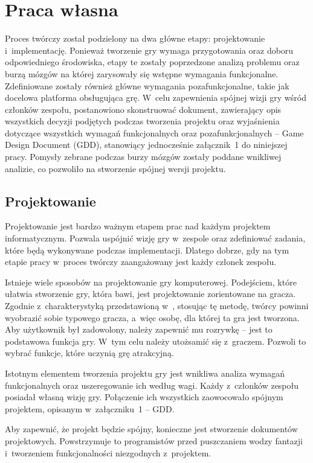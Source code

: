 \chapter{Praca własna}
Proces twórczy został podzielony na dwa główne etapy: projektowanie i~implementację. Ponieważ tworzenie gry wymaga przygotowania oraz doboru odpowiedniego środowiska, etapy te zostały poprzedzone analizą problemu oraz burzą mózgów na której zarysowały się wstępne wymagania funkcjonalne. Zdefiniowane zostały również główne wymagania pozafunkcjonalne, takie jak docelowa platforma obsługująca grę. W~celu zapewnienia spójnej wizji gry wśród członków zespołu, postanowiono skonstruować dokument, zawierający opis wszystkich decyzji podjętych podczas tworzenia projektu oraz wyjaśnienia dotyczące wszystkich wymagań funkcjonalnych oraz pozafunkcjonalnych -- Game Design Document (GDD), stanowiący jednocześnie załącznik~1 do niniejszej pracy.  Pomysły zebrane podczas burzy mózgów zostały poddane wnikliwej analizie, co pozwoliło na stworzenie spójnej wersji projektu. 

\section{Projektowanie}
Projektowanie jest bardzo ważnym etapem prac nad każdym projektem informatycznym. Pozwala uspójnić wizję gry w~zespole oraz zdefiniować zadania, które będą wykonywane podczas implementacji. Dlatego dobrze, gdy na tym etapie pracy w~proces twórczy zaangażowany jest każdy członek zespołu. 

Istnieje wiele sposobów na projektowanie gry komputerowej. Podejściem, które ułatwia stworzenie gry, która bawi, jest projektowanie zorientowane na gracza. Zgodnie z~charakterystyką przedstawioną w~\cite{Adams:pgp}, stosując tę metodę, twórcy powinni wyobrazić sobie typowego gracza, a~więc osobę, dla której ta gra jest tworzona. Aby użytkownik był zadowolony, należy zapewnić mu rozrywkę -- jest to podstawowa funkcja gry. W~tym celu należy utożsamić się z~graczem. Pozwoli to wybrać funkcje, które uczynią grę atrakcyjną.

Istotnym elementem tworzenia projektu gry jest wnikliwa analiza wymagań funkcjonalnych oraz uszeregowanie ich według wagi. Każdy z~członków zespołu posiadał własną wizję gry. Połączenie ich wszystkich zaowocowało spójnym projektem, opisanym w~załączniku~1 -- GDD. 

Aby zapewnić, że projekt będzie spójny, konieczne jest stworzenie dokumentów projektowych. Powstrzymuje to programistów przed puszczaniem wodzy fantazji i~tworzeniem funkcjonalności niezgodnych z~projektem. 


